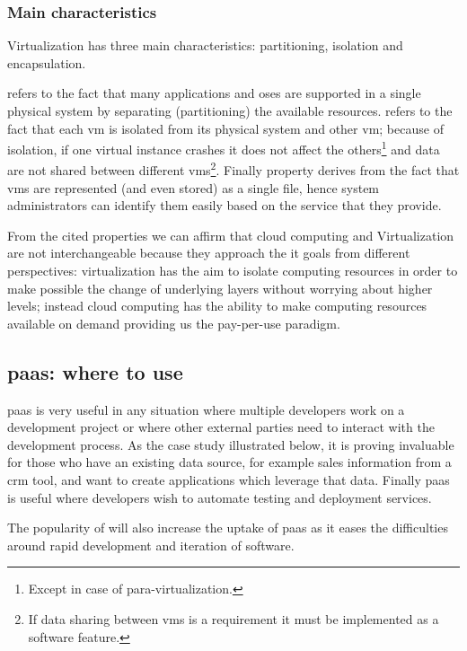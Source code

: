 \subsubsection{Main characteristics}
\label{sec:problemSpace-paas-virtualization-characteristics}
Virtualization has three main characteristics: partitioning, isolation and encapsulation.

 refers to the fact that many applications and \acs{os}es are supported in a single 
physical system by separating (partitioning) the available resources.  refers to the
fact that each \ac{vm} is isolated from its physical system and other \ac{vm}; because of isolation, if
one virtual instance crashes it does not affect the others\footnote{Except in case of para-virtualization.}
and data are not shared between different \ac{vm}s\footnote{If data sharing between \ac{vm}s is a requirement
it must be implemented as a software feature.}. Finally  property derives from
the fact that \ac{vm}s are represented (and even stored) as a single file, hence system administrators
can identify them easily based on the service that they provide.

From the cited properties we can affirm that cloud computing and Virtualization are not interchangeable
because they approach the \acs{it} goals from different perspectives: virtualization has the aim to
isolate computing resources in order to make possible the change of underlying layers without worrying
about higher levels; instead cloud computing has the ability to make computing resources available on
demand providing us the pay-per-use paradigm.

\subsection{\acs{paas}: where to use}
\label{sec:problemSpace-paas-whereToUse}
\ac{paas} is very useful in any situation where multiple developers work on a development project or
where other external parties need to interact with the development process. As the case study illustrated
below, it is proving invaluable for those who have an existing data source, for example sales information
from a \ac{crm} tool, and want to create applications which leverage that data. Finally \ac{paas} is useful
where developers wish to automate testing and deployment services.

The popularity of  will also increase the uptake of \ac{paas} as it eases the
difficulties around rapid development and iteration of software.


